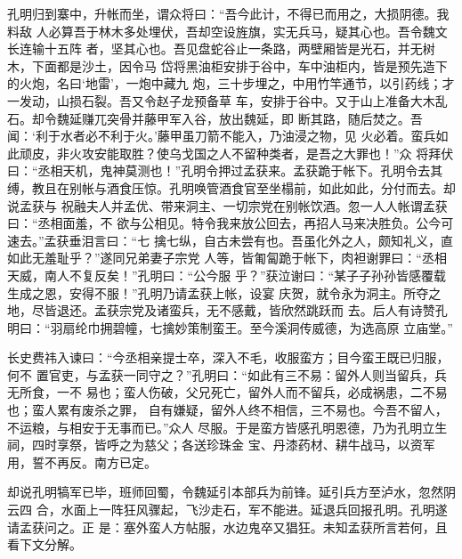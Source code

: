 孔明归到寨中，升帐而坐，谓众将曰：“吾今此计，不得已而用之，大损阴德。我料敌
人必算吾于林木多处埋伏，吾却空设旌旗，实无兵马，疑其心也。吾令魏文长连输十五阵
者，坚其心也。吾见盘蛇谷止一条路，两壁厢皆是光石，并无树木，下面都是沙土，因令马
岱将黑油柜安排于谷中，车中油柜内，皆是预先造下的火炮，名曰‘地雷’，一炮中藏九
炮，三十步埋之，中用竹竿通节，以引药线；才一发动，山损石裂。吾又令赵子龙预备草
车，安排于谷中。又于山上准备大木乱石。却令魏延赚兀突骨并藤甲军入谷，放出魏延，即
断其路，随后焚之。吾闻：‘利于水者必不利于火。’藤甲虽刀箭不能入，乃油浸之物，见
火必着。蛮兵如此顽皮，非火攻安能取胜？使乌戈国之人不留种类者，是吾之大罪也！”众
将拜伏曰：“丞相天机，鬼神莫测也！”孔明令押过孟获来。孟获跪于帐下。孔明令去其
缚，教且在别帐与酒食压惊。孔明唤管酒食官至坐榻前，如此如此，分付而去。却说孟获与
祝融夫人并孟优、带来洞主、一切宗党在别帐饮酒。忽一人人帐谓孟获曰：“丞相面羞，不
欲与公相见。特令我来放公回去，再招人马来决胜负。公今可速去。”孟获垂泪言曰：“七
擒七纵，自古未尝有也。吾虽化外之人，颇知礼义，直如此无羞耻乎？”遂同兄弟妻子宗党
人等，皆匍匐跪于帐下，肉袒谢罪曰：“丞相天威，南人不复反矣！”孔明曰：“公今服
乎？”获泣谢曰：“某子子孙孙皆感覆载生成之恩，安得不服！”孔明乃请孟获上帐，设宴
庆贺，就令永为洞主。所夺之地，尽皆退还。孟获宗党及诸蛮兵，无不感戴，皆欣然跳跃而
去。后人有诗赞孔明曰：“羽扇纶巾拥碧幢，七擒妙策制蛮王。至今溪洞传威德，为选高原
立庙堂。”

长史费祎入谏曰：“今丞相亲提士卒，深入不毛，收服蛮方；目今蛮王既已归服，何不
置官吏，与孟获一同守之？”孔明曰：“如此有三不易：留外人则当留兵，兵无所食，一不
易也；蛮人伤破，父兄死亡，留外人而不留兵，必成祸患，二不易也；蛮人累有废杀之罪，
自有嫌疑，留外人终不相信，三不易也。今吾不留人，不运粮，与相安于无事而已。”众人
尽服。于是蛮方皆感孔明恩德，乃为孔明立生祠，四时享祭，皆呼之为慈父；各送珍珠金
宝、丹漆药材、耕牛战马，以资军用，誓不再反。南方已定。

却说孔明犒军已毕，班师回蜀，令魏延引本部兵为前锋。延引兵方至泸水，忽然阴云四
合，水面上一阵狂风骤起，飞沙走石，军不能进。延退兵回报孔明。孔明遂请孟获问之。正
是：塞外蛮人方帖服，水边鬼卒又猖狂。未知孟获所言若何，且看下文分解。